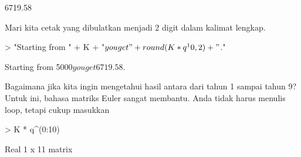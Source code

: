 \documentclass[a4paper,10pt]{article}
\begin{document}
\begin{eulernotebook}
\begin{eulercomment}
\begin{eulercomment}
\begin{eulercomment}
\begin{eulercomment}
\begin{eulercomment}
\begin{eulercomment}
\begin{eulercomment}
\begin{eulercomment}
\begin{eulercomment}
\begin{eulercomment}
\begin{euleroutput}
      6719.58 
\end{euleroutput}
\begin{eulercomment}
Mari kita cetak yang dibulatkan menjadi 2 digit dalam kalimat lengkap.
\end{eulercomment}
\begin{eulerprompt}
> "Starting from " + K + "$ you get " + round(K*q^10,2) + "$."
\end{eulerprompt}
\begin{euleroutput}
  Starting from 5000$ you get 6719.58$.
\end{euleroutput}
\begin{eulercomment}
Bagaimana jika kita ingin mengetahui hasil antara dari tahun 1 sampai
tahun 9? Untuk ini, bahasa matriks Euler sangat membantu. Anda tidak
harus menulis loop, tetapi cukup masukkan
\end{eulercomment}
\begin{eulerprompt}
> K * q^(0:10)
\end{eulerprompt}
\begin{euleroutput}
  Real 1 x 11 matrix
  

\end{euleroutput}
\end{eulercomment}
\end{eulercomment}
\end{eulercomment}
\end{eulercomment}
\end{eulercomment}
\end{eulercomment}
\end{eulercomment}
\end{eulercomment}
\end{eulercomment}
\end{eulercomment}
\end{eulernotebook}
\end{document}
